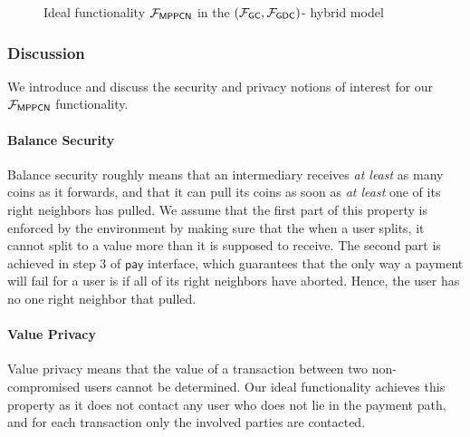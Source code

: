 \begin{figure*}[!t]


\caption{Ideal functionality $\mathcal{F}_{\mathsf{MPPCN}}$ in the $(\mathcal{F}_{\mathsf{GC}}, \mathcal{F}_{\mathsf{GDC}})$-
hybrid model}
\label{fig:ideal-mppcn}
\end{figure*}

\subsubsection{Discussion}
\label{sec:mppcn-discussion}

We introduce and discuss the security and privacy notions of interest for our 
$\mathcal{F}_{\mathsf{MPPCN}}$ functionality.

\paragraph{Balance Security}
Balance security roughly means that an intermediary receives \emph{at least} as many coins as 
it forwards, and that it can pull its coins as soon as \emph{at least} one of its right 
neighbors has pulled. We assume that the first part of this property is enforced by the 
environment by making sure that the when a user splits, it cannot split to a value more than it 
is supposed to receive.  The second part is achieved 
in step 3 of $\mathsf{pay}$ interface, which guarantees that the only way a payment will fail 
for a user is if all of its right neighbors have aborted. Hence, the user has no one right 
neighbor that pulled.

\paragraph{Value Privacy}
Value privacy means that the value of a transaction between two non-compromised users cannot 
be determined. Our ideal functionality achieves this property as it does not contact any user 
who does not lie in the payment path, and for each transaction only the involved parties are 
contacted. 

